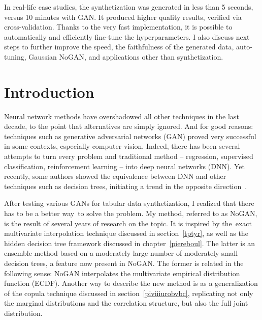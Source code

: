 \documentclass[oneside,10pt]{book}
\begin{document}
In real-life case studies, the synthetization was generated in less than 5 seconds, versus 10 minutes with GAN. It produced higher quality results, verified via cross-validation. Thanks to the very fast implementation, it is possible to automatically and efficiently fine-tune the hyperparameters. I also discuss next steps to further improve the speed, the faithfulness of the generated data, auto-tuning, Gaussian NoGAN, and applications other than synthetization.

\section{Introduction}
Neural network methods have overshadowed all other techniques in the last decade, to the point that alternatives are simply ignored. And for good reasons: techniques such as \textcolor{index}{generative adversarial networks} (GAN) proved very successful in some contexts, especially computer vision. Indeed, there has been several attempts to turn
 every problem and traditional method -- regression, supervised classification, reinforcement learning --  into \textcolor{index}{deep neural networks} (DNN).
 Yet recently, some authors showed the equivalence between DNN and other techniques such as decision trees, initiating a trend in the opposite direction~\cite{caglar22}.


After testing various GANs for tabular data synthetization, I realized that there has to be a better way~to solve the problem. My method,
 referred to as NoGAN,  is the result of several years of research on the topic.  It is inspired by the~exact multivariate interpolation technique discussed in
 section~\ref{tptyr}, as well as the hidden decision tree framework discussed in chapter~\ref{piereboul}. The latter is an ensemble method based on a moderately large number of moderately small decision trees, a feature now present in NoGAN. The former is related in the following sense: NoGAN interpolates the \textcolor{index}{multivariate empirical distribution function} (ECDF). Another way to describe the new method is as a generalization of the \textcolor{index}{copula} technique discussed in section~\ref{piviiiurobvbc}, replicating not only the marginal distributions and the correlation structure, but also the full joint distribution.
\end{document}
